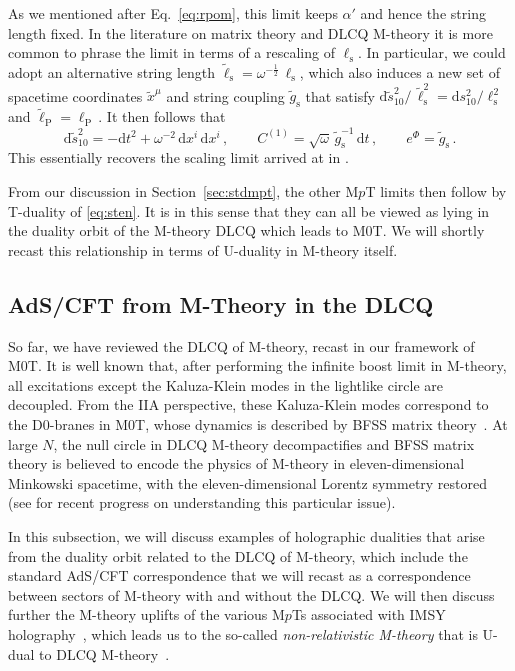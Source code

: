 \documentclass[11pt]{article}
\newcommand{\be}{\begin{equation}}
\newcommand{\ee}{\end{equation}}
\renewcommand{\tilde}[1]{\widetilde{#1}}
\renewcommand{\emph}[1]{\textit{#1}}
\newcommand{\dd}{\mathrm{d}}
\begin{document}
As we mentioned after Eq.~\eqref{eq:rpom}, this limit keeps $\alpha'$ and hence the string length fixed.
In the literature on matrix theory and DLCQ M-theory it is more common to phrase the limit in terms of a rescaling of $\ell_\text{s}$.
In particular, we could adopt an alternative string length  $\tilde{\ell}^{}_\text{s} = \omega^{-\frac{1}{2}} \, \ell^{}_\text{s}$, which also induces a new set of spacetime coordinates $\tilde{x}^\mu$ and string coupling $\tilde{g}^{}_\text{s}$ that satisfy 
%
$\dd\tilde{s}^2_{10} / \, \tilde{\ell}^2_\text{s} = \dd s^2_{10} / \ell^2_\text{s}$ and
$\tilde{\ell}^{}_\text{P} = \ell^{}_\text{P}$\,.
%
It then follows that 
%
\be
    \dd \tilde{s}^2_{10} = - \dd t^2 + \omega^{-2} \, \dd x^i \, \dd x^i\,,
        \qquad%
    C^{(1)} = \sqrt{\omega} \, \tilde{g}^{-1}_\text{s} \, \dd t\,,
        \qquad%
    e^\Phi = \tilde{g}^{}_\text{s}\,.
\ee
%
This essentially recovers the scaling limit arrived at in \cite{Seiberg:1997ad}.

From our discussion in Section~\ref{sec:stdmpt}, the other M$p$T limits then follow by T-duality of \eqref{eq:sten}. 
It is in this sense that they can all be viewed as lying in the duality orbit of the M-theory DLCQ which leads to M0T.
We will shortly recast this relationship in terms of U-duality in M-theory itself.

\subsection{AdS/CFT from M-Theory in the DLCQ} \label{sec:adsdlcq}

So far, we have reviewed the DLCQ of M-theory, recast in our framework of M0T. It is well known that, after performing the infinite boost limit in M-theory, all excitations except the Kaluza-Klein modes in the lightlike circle are decoupled. From the IIA perspective, these Kaluza-Klein modes correspond to the D0-branes in M0T, whose dynamics is described by BFSS matrix theory~\cite{Susskind:1997cw,Seiberg:1997ad,Sen:1997we}. At large $N$, the null circle in DLCQ M-theory decompactifies and BFSS matrix theory is believed \cite{Banks:1996vh} to encode the physics of M-theory in eleven-dimensional Minkowski spacetime, with the eleven-dimensional Lorentz symmetry restored (see \cite{Tropper:2023fjr, Herderschee:2023bnc} for recent progress on understanding this particular issue).

In this subsection, we will discuss examples of holographic dualities that arise from the duality orbit related to the DLCQ of M-theory, which include the standard AdS/CFT correspondence that we will recast as a correspondence between sectors of M-theory with and without the DLCQ. We will then discuss further the M-theory uplifts of the various M$p$Ts associated with IMSY holography~\cite{Itzhaki:1998dd}, which leads us to the so-called \emph{non-relativistic M-theory} that is U-dual to DLCQ M-theory~\cite{Ebert:2023hba, Blair:2023noj}. 
\end{document}
